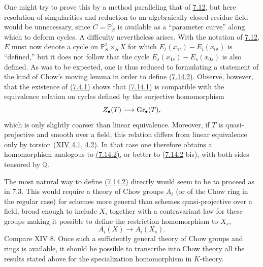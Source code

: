 One might try to prove this by a method paralleling that of \hyperlink{sga6.e10.para.7-12}{7.12}, but here
resolution of singularities and reduction
to an algebraically closed residue field would be unnecessary, since
$C=\mathbb P^1_S$ is available as a
``parameter curve'' along which to deform cycles. A difficulty nevertheless
arises. With the notation of \hyperlink{sga6.e10.para.7-12}{7.12}, $E$ must now denote a cycle on
$\mathbb P^1_S\times_SX$ for which
$E_t(x_{1t})-E_t(x_{0t})$ is ``defined,'' but it does not follow that the
cycle $E_s(x_{1s})-E_s(x_{0s})$ is also defined. As was to be expected, one
is thus reduced to formulating a statement of the kind of Chow's moving
lemma in order to define \hyperlink{sga6.e10.eq.7-14-2}{(7.14.2)}.
Observe, however, that the existence of \hyperlink{sga6.e10.eq.7-4-1}{(7.4.1)} shows that \hyperlink{sga6.e10.eq.7-14-1}{(7.14.1)} is
compatible with the equivalence relation on cycles defined by the surjective
homomorphism
\[
Z_\bullet(T)\longrightarrow\operatorname{Gr}_\bullet(T),
\]
which is only slightly coarser than linear equivalence. Moreover, if $T$ is
quasi-projective and smooth over a field, this relation differs from linear
equivalence only by torsion (\hyperlink{sga6.e14.para.4-1}{XIV 4.1}, \hyperlink{sga6.e14.para.4-2}{4.2}). In that case one therefore obtains
a homomorphism analogous to \hyperlink{sga6.e10.eq.7-14-2}{(7.14.2)}, or better to (\hyperlink{sga6.e10.eq.7-14-2}{7.14.2} bis), with both
sides tensored by $\mathbb Q$.

The most natural way to define \hyperlink{sga6.e10.eq.7-14-2}{(7.14.2)} directly would seem to be to proceed
as in 7.3. This would require a theory of Chow groups $A_i$ (or of the Chow
ring in the regular case) for schemes more general than schemes
quasi-projective over a field, broad enough to include $X$, together with a
contravariant law for these groups making it possible to define the
restriction homomorphism to $X_s$,
\[
A_i(X)\longrightarrow A_i(X_s).
\]
Compare XIV 8. Once such a sufficiently general theory of Chow groups and
rings is available, it should be possible to transcribe into Chow theory all
the results stated above for the specialization homomorphism in $K$-theory.

